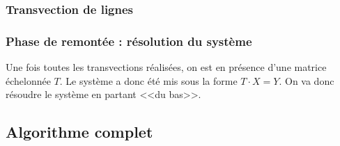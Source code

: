 \documentclass[10pt]{article}
\newif\ifprof
\begin{document}
\subsubsection{Transvection de lignes}

\begin{py}
\ifprof
\begin{python}
def transvection_ligne(A, i, j, mu):
    # L_i <- L_i + mu.L_j 
    nc = len(A[0]) # le nombre de colonnes
    for k in range(nc):
        A[i][k] = A[i][k] + mu * A[j][k]
\end{python}
\else
\vspace{5cm}
\fi
\end{py}

\subsubsection{Phase de remontée : résolution du système}
Une fois toutes les transvections réalisées, on est en présence d'une matrice échelonnée $T$. Le système a donc été mis sous la forme $T\cdot X = Y$. On va donc résoudre le système en partant <<du bas>>.

\begin{py}
\ifprof
\begin{python}
def remontee(A,B):
    n=len(A)
    X = [0.] * n
    for i in range(n-1, -1, -1):
        somme=0
        for j in range (i+1,n):
            somme=somme+A[i][j]*X[j]
        X[i]=(B[i][0]-somme)/A[i][i]
        print(X[i])
    return X
\end{python}
\else
\vspace{8cm}
\fi


\end{py}

 

\subsection{Algorithme complet}
\end{document}
